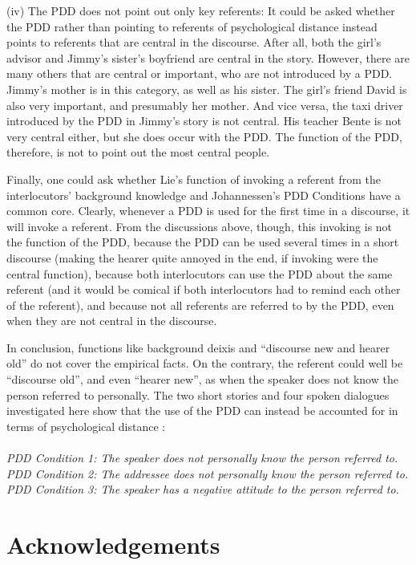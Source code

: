 \documentclass[output=paper,colorlinks,citecolor=brown]{langscibook}
\begin{document}
(iv) The PDD does not point out only key referents: It could be asked whether the PDD rather than pointing to referents of psychological distance instead points to referents that are central in the discourse. After all, both the girl’s advisor and Jimmy’s sister’s boyfriend are central in the story. However, there are many others that are central or important, who are not introduced by a PDD. Jimmy’s mother is in this category, as well as his sister. The girl’s friend David is also very important, and presumably her mother. And vice versa, the taxi driver introduced by the PDD in Jimmy’s story is not central. His teacher Bente is not very central either, but she does occur with the PDD. The function of the PDD, therefore, is not to point out the most central people. 

Finally, one could ask whether Lie’s function of invoking a referent from the interlocutors’ background knowledge and Johannessen’s PDD Conditions have a common core. Clearly, whenever a PDD is used for the first time in a discourse, it will invoke a referent. From the discussions above, though, this invoking is not the function of the PDD, because the PDD can be used several times in a short discourse (making the hearer quite annoyed in the end, if invoking were the central function), because both interlocutors can use the PDD about the same referent (and it would be comical if both interlocutors had to remind each other of the referent), and because not all referents are referred to by the PDD, even when they are not central in the discourse. 

In conclusion, functions like background deixis and “discourse new and hearer old” do not cover the empirical facts. On the contrary, the referent could well be “discourse old”, and even “hearer new”, as when the speaker does not know the person referred to personally. The two short stories and four spoken dialogues investigated here show that the use of the PDD can instead be accounted for in terms of psychological distance \citep{Johannessen2008}:\\
\\
\textit{PDD Condition 1: The speaker does not personally know the person referred to.}\\
\textit{PDD Condition 2: The addressee does not personally know the person referred to.}\\
\textit{PDD Condition 3: The speaker has a negative attitude to the person referred to.}

\section*{Acknowledgements}
\end{document}
